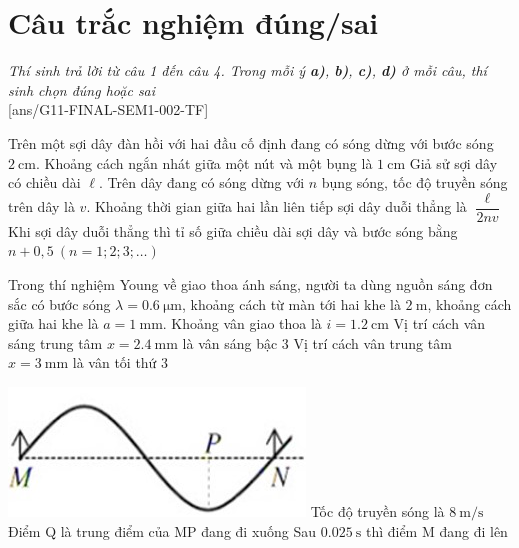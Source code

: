 \section{Câu trắc nghiệm đúng/sai} 
\textit{Thí sinh trả lời từ câu 1 đến câu 4. Trong mỗi ý \textbf{a)}, \textbf{b)}, \textbf{c)}, \textbf{d)} ở mỗi câu, thí sinh chọn đúng hoặc sai}
\setcounter{ex}{0}\\
[ans/G11-FINAL-SEM1-002-TF]
\begin{ex}
Trên một sợi dây đàn hồi với hai đầu cố định đang có sóng dừng với bước sóng $\SI{2}{\centi\meter}$.
	{Khoảng cách ngắn nhát giữa một nút và một bụng là $\SI{1}{\centi\meter}$}
	{Giả sử sợi dây có chiều dài $\ell$. Trên dây đang có sóng dừng với $n$ bụng sóng, tốc độ truyền sóng trên dây là $v$. Khoảng thời gian giữa hai lần liên tiếp sợi dây duỗi thẳng là $\dfrac{\ell}{2nv}$}
	{Khi sợi dây duỗi thẳng thì tỉ số giữa chiều dài sợi dây và bước sóng bằng $n+0,5\ \left(n=1; 2; 3; \dots\right)$}
	\loigiai{}
\end{ex}
\begin{ex}
Trong thí nghiệm Young về giao thoa ánh sáng, người ta dùng nguồn sáng đơn sắc có bước sóng $\lambda=\SI{0.6}{\micro\meter}$, khoảng cách từ màn tới hai khe là $\SI{2}{\meter}$, khoảng cách giữa hai khe là $a=\SI{1}{\milli\meter}$.
	{Khoảng vân giao thoa là $i=\SI{1.2}{\centi\meter}$}
	{Vị trí cách vân sáng trung tâm $x=\SI{2.4}{\milli\meter}$ là vân sáng bậc 3}
	{\True Vị trí cách vân trung tâm $x=\SI{3}{\milli\meter}$ là vân tối thứ 3}
	\loigiai{}
\end{ex}
\begin{ex}
{\includegraphics[scale=0.7]{../figs/G11-FINAL-SEM1-002-3}}
	{\True Tốc độ truyền sóng là $\SI{8}{\meter/\second}$}
	{\True Điểm Q là trung điểm của MP đang đi xuống}
	{Sau $\SI{0.025}{\second}$ thì điểm M đang đi lên}
	\loigiai{}
\end{ex}
